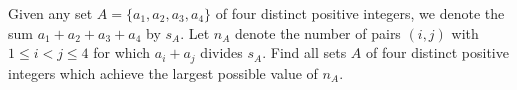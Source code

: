 Given any set $A = \{a_1, a_2, a_3, a_4\}$ of four distinct
positive integers, we denote the sum $a_1+a_2+a_3+a_4$ by $s_A$.
Let $n_A$ denote the number of pairs $(i,j)$ with $1 \le i < j \le 4$
for which $a_i + a_j$ divides $s_A$.
Find all sets $A$ of four distinct positive integers which achieve
the largest possible value of $n_A$.